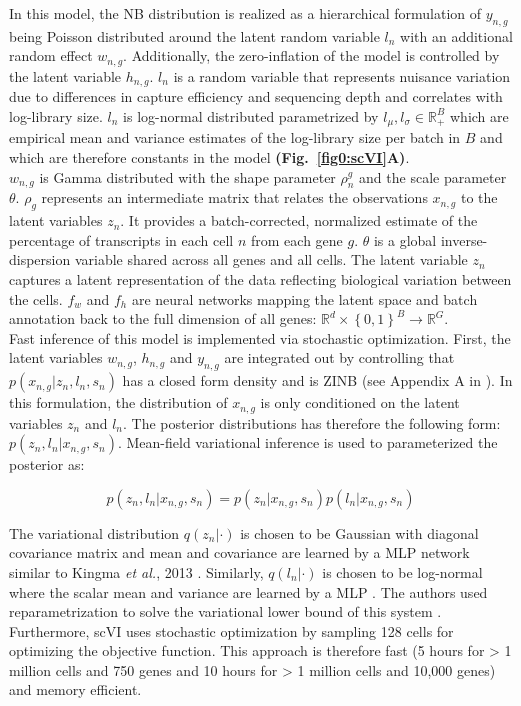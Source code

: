 \vspace{1cm}

In this model, the NB distribution is realized as a hierarchical formulation of $y_{n,g}$ being Poisson distributed around the latent random variable $l_n$ with an additional random effect $w_{n,g}$. Additionally, the zero-inflation of the model is controlled by the latent variable $h_{n,g}$. $l_n$ is a random variable that represents nuisance variation due to differences in capture efficiency and sequencing depth and correlates with log-library size. $l_n$ is log-normal distributed parametrized by $l_\mu,l_\sigma\in\mathbb{R}^B_+$ which are empirical mean and variance estimates of the log-library size per batch in $B$ and which are therefore constants in the model \textbf{(Fig.~\ref{fig0:scVI}A)}.\\

$w_{n,g}$ is Gamma distributed with the shape parameter $\rho_n^g$ and the scale parameter $\theta$. $\rho_g$ represents an intermediate matrix that relates the observations $x_{n,g}$ to the latent variables $z_n$. It provides a batch-corrected, normalized estimate of the percentage of transcripts in each cell $n$ from each gene $g$. $\theta$ is a global inverse-dispersion variable shared across all genes and all cells. The latent variable $z_n$ captures a latent representation of the data reflecting biological variation between the cells. $f_w$ and $f_h$ are neural networks mapping the latent space and batch annotation back to the full dimension of all genes: $\mathbb{R}^d\times{}\left\lbrace0,1\right\rbrace^B\rightarrow\mathbb{R}^G$.\\

Fast inference of this model is implemented via stochastic optimization. First, the latent variables $w_{n,g}$, $h_{n,g}$ and $y_{n,g}$ are integrated out by controlling that $p(x_{n,g}|z_n,l_n,s_n)$ has a closed form density and is ZINB (see Appendix A in \citep{Lopez2018}). In this formulation, the distribution of $x_{n,g}$ is only conditioned on the latent variables $z_n$ and $l_n$. The posterior distributions has therefore the following form: $p(z_n,l_n|x_{n,g},s_n)$. Mean-field variational inference is used to parameterized the posterior as:

\begin{equation}
p(z_n,l_n|x_{n,g},s_n)=p(z_n|x_{n,g},s_n)p(l_n|x_{n,g},s_n)
\end{equation} 

The variational distribution $q(z_n|\cdot)$ is chosen to be Gaussian with diagonal covariance matrix and mean and covariance are learned by a \gls{MLP} network similar to Kingma \emph{et al.}, 2013 \citep{Kingma2013}. Similarly, $q(l_n|\cdot)$ is chosen to be log-normal where the scalar mean and variance are learned by a MLP \citep{Kingma2013}. The authors used reparametrization to solve the variational lower bound of this system \cite{Lopez2018, Kingma2013}. Furthermore, scVI uses stochastic optimization by sampling 128 cells for optimizing the objective function. This approach is therefore fast (5 hours for > 1 million cells and 750 genes and 10 hours for > 1 million cells and 10,000 genes) and memory efficient. \\

